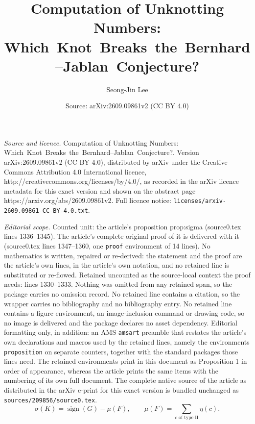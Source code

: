 \documentclass[10pt,a4paper]{amsart}
\title{Computation of Unknotting Numbers:\\ \mbox{Which Knot Breaks the Bernhard--Jablan Conjecture?}}
\author{Seong-Jin Lee}
\date{Source: arXiv:2609.09861v2 (CC BY 4.0)}
\begin{document}
\maketitle

\noindent\emph{Source and licence.} Computation of Unknotting Numbers:\\ \mbox{Which Knot Breaks the Bernhard--Jablan Conjecture?}. Version arXiv:2609.09861v2 (CC BY 4.0), distributed by arXiv under the Creative Commons Attribution 4.0 International licence, http://creativecommons.org/licenses/by/4.0/, as recorded in the arXiv licence metadata for this exact version and shown on the abstract page https://arxiv.org/abs/2609.09861v2. Full licence notice: \texttt{licenses/arxiv-2609.09861-CC-BY-4.0.txt}.\par\smallskip

\noindent\textit{Editorial scope.} Counted unit: the article's proposition prop:sigma (source0.tex lines 1336--1345). The article's complete original proof of it is delivered with it (source0.tex lines 1347--1360, one \texttt{proof} environment of 14 lines). No mathematics is written, repaired or re-derived: the statement and the proof are the article's own lines, in the article's own notation, and no retained line is substituted or re-flowed.  Retained uncounted as the source-local context the proof needs: lines 1330--1333.  Nothing was omitted from any retained span, so the package carries no omission record.  No retained line contains a citation, so the wrapper carries no bibliography and no bibliography entry.  No retained line contains a figure environment, an image-inclusion command or drawing code, so no image is delivered and the package declares no asset dependency.  Editorial formatting only, in addition: an AMS \texttt{amsart} preamble that restates the article's own declarations and macros used by the retained lines, namely the environments \texttt{proposition} on separate counters, together with the standard packages those lines need.  The retained environments print in this document as Proposition 1 in order of appearance, whereas the article prints the same items with the numbering of its own full document.  The complete native source of the article as distributed in the arXiv e-print for this exact version is bundled unchanged as \texttt{sources/209856/source0.tex}.
\begin{equation}\label{eq:gl}
    \sigma(K)=\operatorname{sign}(G)-\mu(F),\qquad
    \mu(F)=\sum_{c\text{ of type II}}\eta(c).
\end{equation}
\end{document}
